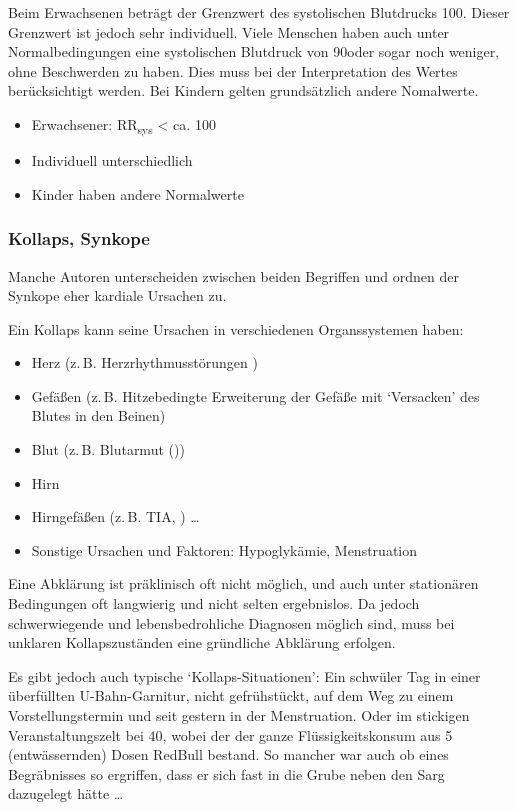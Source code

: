  
{%
Beim Erwachsenen beträgt der  Grenzwert des
systolischen Blutdrucks 100\MmHg*. 
Dieser Grenzwert ist jedoch sehr individuell. Viele
Menschen haben auch unter Normalbedingungen eine
systolischen Blutdruck von 90\MmHg* oder sogar noch
weniger, ohne Beschwerden zu haben. Dies muss bei der
Interpretation des Wertes berücksichtigt werden. Bei Kindern
gelten grundsätzlich andere Nomalwerte.
\citep{PraxisleitAllgemeinmed6} }{%
\begin{itemize}
  \item Erwachsener: RR\textsubscript{sys} {\textless}
  ca. 100\MmHg*
  \item Individuell unterschiedlich
  \item Kinder haben andere Normalwerte
\end{itemize}
}{}{}{}


\subsubsection{Kollaps, Synkope}
\label{topic:kollaps}
\label{topic:synkope}


{%
Manche Autoren unterscheiden zwischen beiden Begriffen und 
ordnen der Synkope eher kardiale Ursachen zu. 

Ein Kollaps kann seine Ursachen in verschiedenen
Organssystemen haben:
\begin{itemize}
  \item Herz (z.\,B. Herzrhythmusstörungen )
  \item Gefäßen (z.\,B. Hitzebedingte Erweiterung
  der Gefäße mit \enquote*{Versacken} des Blutes in den
  Beinen)
  \item Blut (z.\,B. Blutarmut ())
  \item Hirn
  \item Hirngefäßen (z.\,B. TIA,
   ) \ldots
  \item Sonstige Ursachen und Faktoren: Hypoglykämie, 
  Menstruation
\end{itemize}

Eine Abklärung ist präklinisch oft nicht möglich, und auch
unter stationären Bedingungen oft langwierig und nicht
selten ergebnislos. Da jedoch schwerwiegende und
lebensbedrohliche Diagnosen möglich sind, muss bei unklaren
Kollapszuständen eine gründliche Abklärung erfolgen.

Es gibt jedoch auch typische \enquote*{Kollaps-Situationen}:
Ein schwüler Tag in einer überfüllten U-Bahn-Garnitur, nicht
gefrühstückt, auf dem Weg zu einem Vorstellungstermin und
seit gestern in der Menstruation. Oder im stickigen
Veranstaltungszelt bei 40\Deg , wobei der der ganze
Flüssigkeitskonsum aus 5 (entwässernden) Dosen
RedBull{\texttrademark}
bestand. So mancher war auch ob eines Begräbnisses so
ergriffen, dass er sich fast in die Grube neben den Sarg
dazugelegt hätte \ldots 
}{%

}{}{}{}


